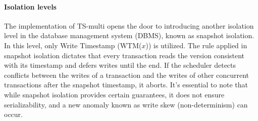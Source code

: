 \paragraph*{Isolation levels}
The implementation of TS-multi opens the door to introducing another isolation level in the database management system (DBMS), known as snapshot isolation.
In this level, only Write Timestamp (WTM($x$)) is utilized.
The rule applied in snapshot isolation dictates that every transaction reads the version consistent with its timestamp and defers writes until the end. 
If the scheduler detects conflicts between the writes of a transaction and the writes of other concurrent transactions after the snapshot timestamp, it aborts.
It's essential to note that while snapshot isolation provides certain guarantees, it does not ensure serializability, and a new anomaly known as write skew (non-determinism) can occur.